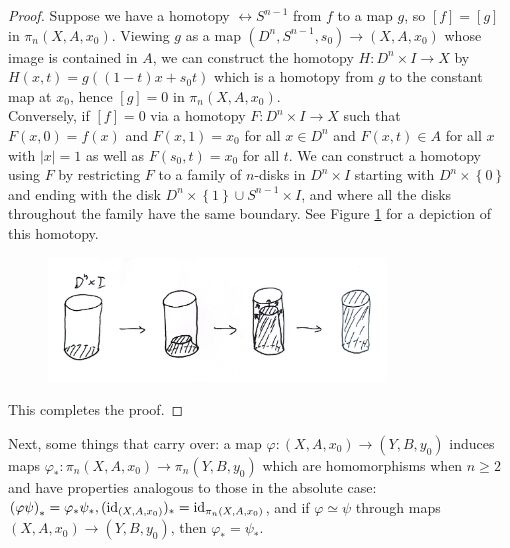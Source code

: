   \begin{proof}
      Suppose we have a homotopy
      $\rel S^{n-1}$ from $f$ to a map
      $g$, so
      $\left[ f \right] = \left[ g \right] $ in
      $\pi_n \left( X, A, x_0 \right) $. 
      Viewing $g$ as a map
      $\left( D^{n}, S^{n-1}, s_0 \right) 
      \to \left( X, A, x_0 \right) $ whose
      image is contained in $A$, we
      can construct the homotopy
      $H \colon D^{n} \times I \to X$ by
      $H(x,t) = g\left( (1-t) x + s_0 t \right) $ 
      which is a homotopy from $g$ to the
      constant map at $x_0$, hence
      $\left[ g \right]  = 0$ in $\pi_n (X, A, x_0)$.\\
      Conversely, if $\left[ f \right] = 0$ via
      a homotopy $F \colon D^{n} \times I \to X$ such that
      $F(x,0) = f(x)$ and
      $F(x,1) = x_0$ for all $x \in D^{n}$ and
      $F(x,t) \in A$ for all
      $x$ with $\left| x \right| = 1$ as well
      as $F(s_0,t) = x_0$ for all $t$. We can
      construct a homotopy
      using $F$ by restricting $F$ to a family of
      $n$-disks in $D^{n} \times I$ starting with
      $D^{n}\times \left\{ 0 \right\} $ and ending
      with the disk $D^{n} \times \left\{ 1 \right\} 
      \cup S^{n-1} \times I$, and where all the disks
      throughout the family have the same boundary.
      See Figure \ref{fig:DJIMMXKXO0O-jpeg} for a depiction
      of this homotopy.

      \begin{figure}[htpb]
          \centering
          \includegraphics[width=0.8\textwidth]{Figures/DJIMMXKXO0O.jpeg}
          \caption{}
          \label{fig:DJIMMXKXO0O-jpeg}
      \end{figure}
      This completes the proof.
  \end{proof}

  Next, some things that carry over:
  a map $\varphi \colon \left( X, A, x_0 \right) 
  \to \left( Y, B, y_0 \right) $ induces maps
  $\varphi_* \colon \pi_n \left( X, A, x_0 \right) 
  \to \pi_n \left( Y, B, y_0 \right) $ which are
  homomorphisms when $n\ge 2$ and have properties analogous
  to those in the absolute case: 
  $\left( \varphi \psi  \right)_* = 
  \varphi_* \psi_*, ({\mathrm{id}}_{(X,A,x_0)})_{*} = {\mathrm{id}}_{\pi_n (X, A, x_0)}$,
  and if  $\varphi \simeq \psi $ through maps
  $\left( X,A,x_0 \right) \to \left( Y,B,y_0 \right) $,
  then $\varphi_* = \psi_*$. 

